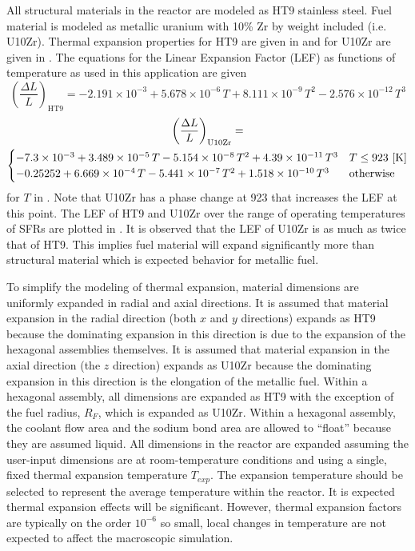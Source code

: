   All structural materials in the reactor are modeled as HT9 stainless steel.
  Fuel material is modeled as metallic uranium with 10\% Zr by weight included
  (i.e. U10Zr). Thermal expansion properties for HT9 are given in \cite{ht9Prop}
  and for U10Zr are given in \cite{thexpU10Zr}. The equations for the Linear
  Expansion Factor (LEF) as functions of temperature as used in this application 
  are given
  \begin{equation}
    \label{eq:lef_ht9}
    \left( \frac{\Delta L}{L} \right)_{\text{HT9}} = 
      -2.191 \times 10^{-3} + 5.678 \times 10^{-6} \, T + 
      8.111 \times 10^{-9} \, T^2 - 2.576 \times 10^{-12} \, T^3 
  \end{equation}
  \begin{multline}
    \label{eq:lef_u10zr}
    \left( \frac{\Delta L}{L} \right)_{\text{U10Zr}} = \\
      \begin{cases}
        -7.3 \times 10^{-3} + 3.489 \times 10^{-5} \, T 
          - 5.154 \times 10^{-8} \, T^2 + 4.39 \times 10^{-11} \, T^3 & 
          T \le 923 \,\left[\text{{K}}\right] \\
        -0.25252 + 6.669 \times 10^{-4} \, T - 5.441 \times 10^{-7} \, T^2 
          + 1.518 \times 10^{-10} \, T^3 & \text{otherwise}
      \end{cases}
  \end{multline}
  for $T$ in . Note that U10Zr has a phase change at 923  that 
  increases the LEF at this point. The LEF of HT9 and U10Zr over the range of
  operating temperatures of SFRs are plotted in .  It is 
  observed that the LEF of U10Zr is as much as twice that of HT9. This implies
  fuel material will expand significantly more than structural material which is
  expected behavior for metallic fuel.

  To simplify the modeling of thermal expansion, material dimensions are
  uniformly expanded in radial and axial directions. It is assumed that material
  expansion in the radial direction (both $x$ and $y$ directions) expands
  as HT9 because the dominating expansion in this direction is
  due to the expansion of the hexagonal assemblies themselves. It is assumed 
  that material expansion in the axial direction (the $z$ direction) expands
  as U10Zr because the dominating expansion in this direction is the elongation
  of the metallic fuel. Within a hexagonal assembly, all dimensions are expanded
  as HT9 with the exception of the fuel radius, $R_F$, which is expanded as 
  U10Zr. Within a hexagonal assembly, the coolant flow area and the sodium bond
  area are allowed to ``float'' because they are assumed liquid. All dimensions
  in the reactor are expanded assuming the user-input dimensions are at
  room-temperature conditions and using a single, fixed thermal expansion
  temperature $T_{exp}$. The expansion temperature should be selected to
  represent the average temperature within the reactor. It is expected thermal
  expansion effects will be significant. However, thermal expansion factors are
  typically on the order $10^{-6}$ so small, local changes in temperature are
  not expected to affect the macroscopic simulation.

